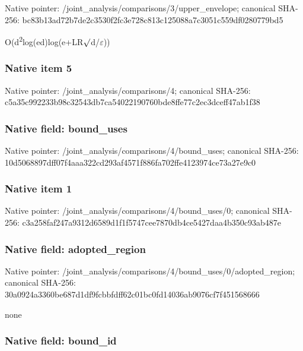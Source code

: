 \documentclass[10pt,a4paper]{article}
\begin{document}
Native pointer: /joint\_analysis/comparis\allowbreak{}ons/3/upper\_envelope; canonical SHA-256: bc83b13ad72b7de2c3530f2f\allowbreak{}c3e728c813c125088a7c3051\allowbreak{}c559df0280779bd5


O(d\textsuperscript{2}log(ed)log(e+LR\ensuremath{\sqrt{\vphantom{x}}}d/\ensuremath{\varepsilon}))


\subsubsection{Native item 5}


Native pointer: /joint\_analysis/comparisons/4; canonical SHA-256: c5a35c992233b98c32543db7\allowbreak{}ca54022190760bde8ffe77c2\allowbreak{}ec3dceff47ab1f38



\subsubsection{Native field: bound\_uses}


Native pointer: /joint\_analysis/comparis\allowbreak{}ons/4/bound\_uses; canonical SHA-256: 10d5068897dff07f4aaa322c\allowbreak{}d293af4571f886fa702ffe41\allowbreak{}23974ce73a27e9c0



\subsubsection{Native item 1}


Native pointer: /joint\_analysis/comparis\allowbreak{}ons/4/bound\_uses/0; canonical SHA-256: c3a258faf247a9312d6589d1\allowbreak{}f1f5747cee7870db4ce5427d\allowbreak{}aa4b350c93ab487e



\subsubsection{Native field: adopted\_region}


Native pointer: /joint\_analysis/comparis\allowbreak{}ons/4/bound\_uses/0/adopt\allowbreak{}ed\_region; canonical SHA-256: 30a0924a3360be687d1df9fc\allowbreak{}bbfdff62c01bc0fd14036ab9\allowbreak{}076cf7f451568666


none


\subsubsection{Native field: bound\_id}
\end{document}
